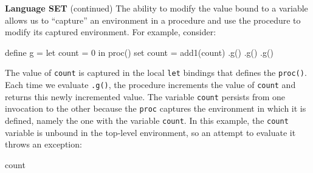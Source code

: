 \begin{minipage}[t]{\sw}
\slidenumber
\LARGE
{\bf Language SET} (continued)\exx
The ability to modify the value bound to a variable allows us
to ``capture'' an environment in a procedure
and use the procedure to modify its captured environment.
For example, consider:
\begin{qv}
define g = let
             count = 0
           in
             proc() set count = add1(count)
.g() %
.g() %
.g() %
\end{qv}
The value of \verb'count' is captured in the local \verb'let' bindings
that defines the \verb'proc()'.
Each time we evaluate \verb'.g()',
the procedure increments the value of \verb'count'
and returns this newly incremented value.
The variable \verb'count' persists
from one invocation to the other
because the \verb'proc' captures the environment
in which it is defined,
namely the one with the variable \verb'count'.\exx
In this example,
the \verb'count' variable is unbound in the top-level environment,
so an attempt to evaluate it throws an exception:
\begin{qv}
count %
\end{qv}
\end{minipage}
\clearpage

